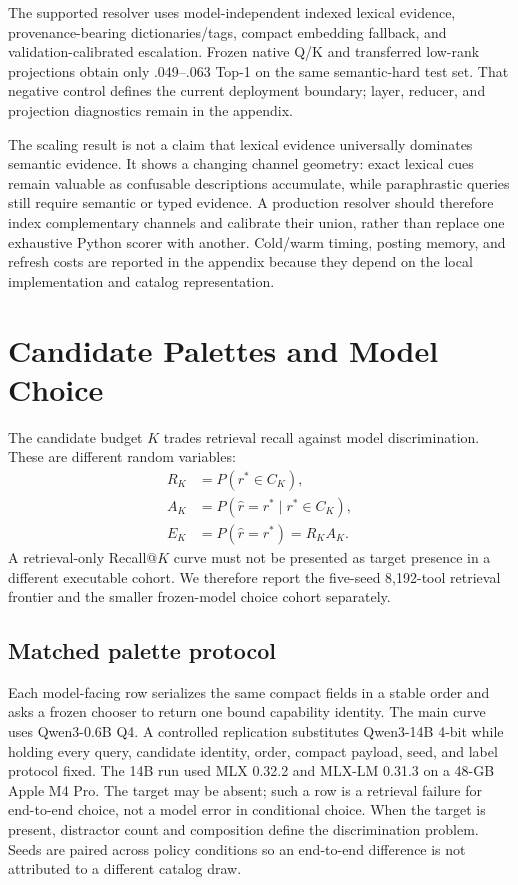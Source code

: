 \documentclass[11pt]{article}
\begin{document}
The supported resolver uses model-independent indexed lexical evidence,
provenance-bearing dictionaries/tags, compact embedding fallback, and
validation-calibrated escalation. Frozen native Q/K and transferred low-rank
projections obtain only .049--.063 Top-1 on the same semantic-hard test set.
That negative control defines the current deployment boundary; layer, reducer,
and projection diagnostics remain in the appendix.

The scaling result is not a claim that lexical evidence universally dominates
semantic evidence. It shows a changing channel geometry: exact lexical cues
remain valuable as confusable descriptions accumulate, while paraphrastic
queries still require semantic or typed evidence. A production resolver should
therefore index complementary channels and calibrate their union, rather than
replace one exhaustive Python scorer with another. Cold/warm timing, posting
memory, and refresh costs are reported in the appendix because they depend on
the local implementation and catalog representation.

\section{Candidate Palettes and Model Choice}

The candidate budget $K$ trades retrieval recall against model discrimination.
These are different random variables:
\begin{align}
R_K &= P(r^*\in C_K),\\
A_K &= P(\widehat r=r^*\mid r^*\in C_K),\\
E_K &= P(\widehat r=r^*)=R_K A_K.
\end{align}
A retrieval-only Recall@$K$ curve must not be presented as target presence in a
different executable cohort. We therefore report the five-seed 8,192-tool
retrieval frontier and the smaller frozen-model choice cohort separately.

\subsection{Matched palette protocol}

Each model-facing row serializes the same compact fields in a stable order and
asks a frozen chooser to return one bound capability identity. The main curve
uses Qwen3-0.6B Q4. A controlled replication substitutes Qwen3-14B 4-bit while
holding every query, candidate identity, order, compact payload, seed, and
label protocol fixed. The 14B run used MLX 0.32.2 and MLX-LM 0.31.3 on a 48-GB
Apple M4 Pro. The target may
be absent; such a row is a retrieval failure for end-to-end choice, not a model
error in conditional choice. When the target is present, distractor count and
composition define the discrimination problem. Seeds are paired across policy
conditions so an end-to-end difference is not attributed to a different
catalog draw.
\end{document}
